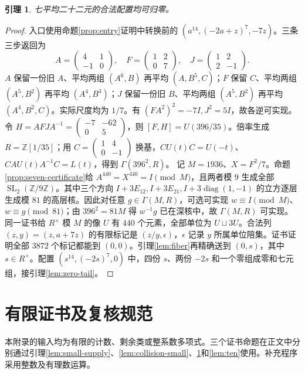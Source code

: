 \documentclass[11pt,a4paper]{article}
\newcommand{\Z}{\mathbb Z}
\newcommand{\SL}{\operatorname{SL}}
\newcommand{\diag}{\operatorname{diag}}
\newtheorem{lemma}[theorem]{引理}
\theoremstyle{definition}
\numberwithin{equation}{section}
\begin{document}
\begin{lemma}\label{lem:seven22}
七平均二十二元的合法配置均可归零。
\end{lemma}
\begin{proof}
入口使用命题\ref{prop:entry}证明中转换前的 $(a^{14},(-2a+z)^7,-7z)$。三条三步返回为
\[
A=\begin{pmatrix}4&1\\-1&0\end{pmatrix},\quad
F=\begin{pmatrix}1&2\\0&7\end{pmatrix},\quad
J=\begin{pmatrix}1&2\\2&-1\end{pmatrix}.
\]
$A$ 保留一份旧 $A$、平均两组 $(A^6,B)$ 再平均 $(A,B^5,C)$；$F$ 保留 $C$、平均两组 $(A^5,B^2)$ 再平均 $(A^4,B^3)$；$J$ 保留一份旧 $B$、平均两组 $(A^5,B^2)$ 再平均 $(A^4,B^2,C)$。实际尺度均为 $1/7$。有 $(FA^2)^2=-7I,J^2=5I$，故各逆可实现。
令 $H=AFJA^{-1}=\left(\begin{smallmatrix}-7&-62\\0&5\end{smallmatrix}\right)$，则 $[F,H]=U(396/35)$。倍率生成 $R=\Z[1/35]$；用 $C=\left(\begin{smallmatrix}1&4\\0&-1\end{smallmatrix}\right)$ 换基，$CU(t)C=U(-t)$、$CAU(t)A^{-1}C=L(t)$，得到 $\Gamma(396^2,R)$。
记 $M=1936$、$X=F^2/7$。命题\ref{prop:seven-certificate}给 $A^{440}=X^{440}=I\pmod M$，且两者模 $9$ 生成全部 $\SL_2(\Z/9\Z)$。其中三个方向 $I+3E_{12},I+3E_{21},I+3\diag(1,-1)$ 的立方逐层生成模 $81$ 的高层核。因此对任意 $g\in\Gamma(M,R)$，可选可实现 $w\equiv I\pmod M$、$w\equiv g\pmod{81}$；由 $396^2=81M$ 得 $w^{-1}g$ 已在深核中，故 $\Gamma(M,R)$ 可实现。
同一证书给 $R^\times$ 模 $M$ 的像 $U$ 有 $440$ 个元素，全部单位为 $U\sqcup3U$。合法列 $(z,y)=(z,a+7z)$ 的有限标记是 $(z/y,\epsilon)$，$\epsilon$ 记录 $y$ 所属单位陪集。证书证明全部 $3872$ 个标记都能到 $(0,0)$。引理\ref{lem:fiber}再精确送到 $(0,s)$，其中 $s\in R^\times$。配置 $(s^{14},(-2s)^7,0)$ 中，四份 $s$、两份 $-2s$ 和一个零组成零和七元组，接引理\ref{lem:zero-tail}。
\end{proof}


\section{有限证书及复核规范}\label{app:certificates}
本附录的输入均为有限的计数、剩余类或整系数多项式。三个证书命题在正文中分别通过引理\ref{lem:small-supply}、\ref{lem:collision-small}、\ref{lem:seven22}和\ref{lem:ten}使用。补充程序采用整数及有理数运算。
\end{document}
